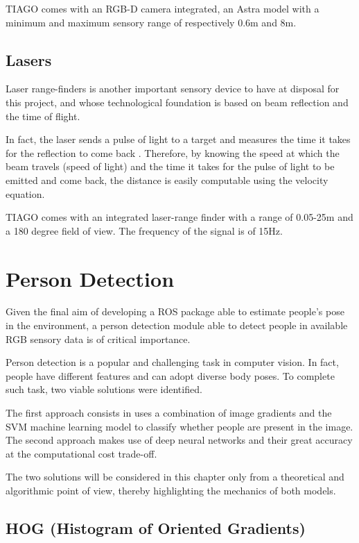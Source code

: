 TIAGO comes with an RGB-D camera integrated, an Astra model with a minimum and maximum sensory range of respectively 0.6m and 8m.

\subsection{Lasers}

Laser range-finders is another important sensory device to have at disposal for this project, and whose technological foundation is based on beam reflection and the time of flight.

In fact, the laser sends a pulse of light to a target and measures the time it takes for the reflection to come back \cite{website:lasers}. Therefore, by knowing the speed at which the beam travels (speed of light) and the time it takes for the pulse of light to be emitted and come back, the distance is easily computable using the velocity equation.

TIAGO comes with an integrated laser-range finder with a range of 0.05-25m and a 180 degree field of view. The frequency of the signal is of 15Hz.

\section{Person Detection}

Given the final aim of developing a ROS package able to estimate people's pose in the environment, a person detection module able to detect people in available RGB sensory data is of critical importance.

Person detection is a popular and challenging task in computer vision. In fact, people have different features and can adopt diverse body poses. To complete such task, two viable solutions were identified.

The first approach consists in uses a combination of image gradients and the SVM machine learning model to classify whether people are present in the image. The second approach makes use of deep neural networks and their great accuracy at the computational cost trade-off.

The two solutions will be considered in this chapter only from a theoretical and algorithmic point of view, thereby highlighting the mechanics of both models.

\subsection{HOG (Histogram of Oriented Gradients)}

